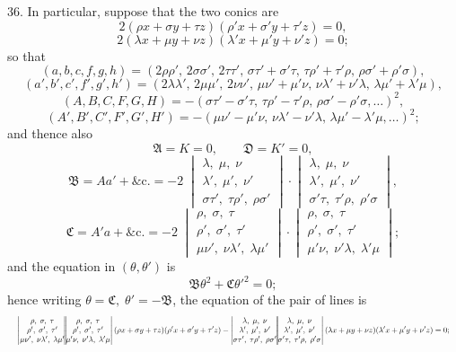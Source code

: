 \documentclass[11pt]{article}
\begin{document}
\textsc{36.} In particular, suppose that the two conics are
\[ 2(\rho x+\sigma y+\tau z)(\rho' x+\sigma' y+\tau' z)=0, \]
\[ 2(\lambda x+\mu y+\nu z)(\lambda' x+\mu' y+\nu' z)=0; \]
so that
\[ (a,b,c,f,g,h)=(2\rho\rho',\,2\sigma\sigma',\,2\tau\tau',\,\sigma\tau'+\sigma'\tau,\,\tau\rho'+\tau'\rho,\,\rho\sigma'+\rho'\sigma), \]
\[ (a',b',c',f',g',h')=(2\lambda\lambda',\,2\mu\mu',\,2\nu\nu',\,\mu\nu'+\mu'\nu,\,\nu\lambda'+\nu'\lambda,\,\lambda\mu'+\lambda'\mu), \]
\[ (A,B,C,F,G,H)=-(\sigma\tau'-\sigma'\tau,\,\tau\rho'-\tau'\rho,\,\rho\sigma'-\rho'\sigma,\dots)^{2}, \]
\[ (A',B',C',F',G',H')=-(\mu\nu'-\mu'\nu,\,\nu\lambda'-\nu'\lambda,\,\lambda\mu'-\lambda'\mu,\dots)^{2}; \]
and thence also
\[ \mathfrak{A}=K=0,\qquad \mathfrak{D}=K'=0, \]
\[ \mathfrak{B}=Aa'+\&\mathrm{c}.=-2\;\begin{vmatrix}\lambda,\;\mu,\;\nu\\ \lambda',\;\mu',\;\nu'\\ \sigma\tau',\;\tau\rho',\;\rho\sigma'\end{vmatrix}\cdot\begin{vmatrix}\lambda,\;\mu,\;\nu\\ \lambda',\;\mu',\;\nu'\\ \sigma'\tau,\;\tau'\rho,\;\rho'\sigma\end{vmatrix}, \]
\[ \mathfrak{C}=A'a+\&\mathrm{c}.=-2\;\begin{vmatrix}\rho,\;\sigma,\;\tau\\ \rho',\;\sigma',\;\tau'\\ \mu\nu',\;\nu\lambda',\;\lambda\mu'\end{vmatrix}\cdot\begin{vmatrix}\rho,\;\sigma,\;\tau\\ \rho',\;\sigma',\;\tau'\\ \mu'\nu,\;\nu'\lambda,\;\lambda'\mu\end{vmatrix}; \]
and the equation in $(\theta,\theta')$ is
\[ \mathfrak{B}\theta^{2}+\mathfrak{C}\theta'^{2}=0; \]
hence writing $\theta=\mathfrak{C},\;\theta'=-\mathfrak{B}$, the equation of the pair of lines is
\[ \resizebox{\textwidth}{!}{$\displaystyle
\begin{vmatrix}\rho,\;\sigma,\;\tau\\ \rho',\;\sigma',\;\tau'\\ \mu\nu',\;\nu\lambda',\;\lambda\mu'\end{vmatrix}
\!\!\!\!\begin{vmatrix}\rho,\;\sigma,\;\tau\\ \rho',\;\sigma',\;\tau'\\ \mu'\nu,\;\nu'\lambda,\;\lambda'\mu\end{vmatrix}
(\rho x+\sigma y+\tau z)(\rho' x+\sigma' y+\tau' z)
-\begin{vmatrix}\lambda,\;\mu,\;\nu\\ \lambda',\;\mu',\;\nu'\\ \sigma\tau',\;\tau\rho',\;\rho\sigma'\end{vmatrix}
\!\!\!\!\begin{vmatrix}\lambda,\;\mu,\;\nu\\ \lambda',\;\mu',\;\nu'\\ \sigma'\tau,\;\tau'\rho,\;\rho'\sigma\end{vmatrix}
(\lambda x+\mu y+\nu z)(\lambda' x+\mu' y+\nu' z)=0;$} \]
\end{document}
